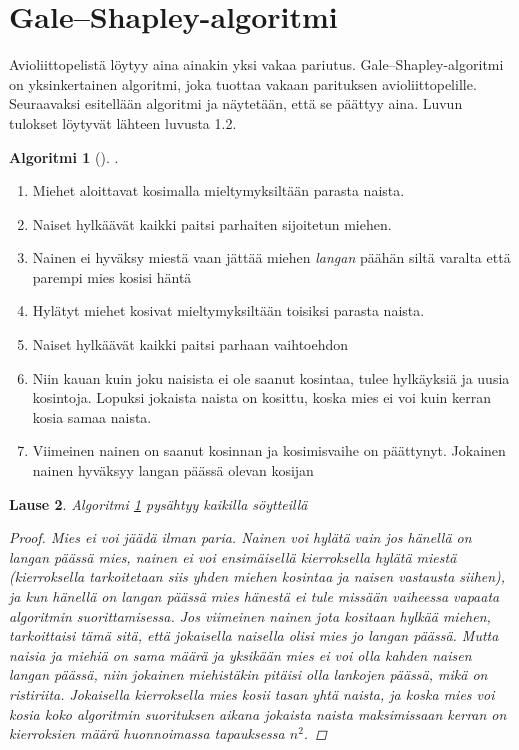 \documentclass[finnish]{tktltiki2}
\newtheorem{lau}{Lause}
\theoremstyle{definition}
\newtheorem{alg}[lau]{Algoritmi}
\theoremstyle{remark}
\begin{document}
\section{Gale--Shapley-algoritmi}
Avioliittopelistä löytyy aina ainakin yksi vakaa pariutus. Gale--Shapley-algoritmi on yksinkertainen algoritmi, joka tuottaa vakaan parituksen avioliittopelille. Seuraavaksi esitellään algoritmi ja näytetään, että se päättyy aina. Luvun tulokset löytyvät lähteen \cite{gusfield1989stable} luvusta 1.2.
\begin{alg} [\cite{gale62a}] \label{gsalg}.
\begin{enumerate}
	\item Miehet aloittavat kosimalla mieltymyksiltään parasta naista.
	\item Naiset hylkäävät kaikki paitsi parhaiten sijoitetun miehen.
	\item Nainen ei hyväksy miestä vaan jättää miehen \emph{langan} päähän siltä varalta että parempi mies kosisi häntä
	\item Hylätyt miehet kosivat mieltymyksiltään toisiksi parasta naista.
	\item Naiset hylkäävät kaikki paitsi parhaan vaihtoehdon
	\item Niin kauan kuin joku naisista ei ole saanut kosintaa, tulee hylkäyksiä ja uusia kosintoja. Lopuksi jokaista naista on kosittu, koska mies ei voi kuin kerran kosia samaa naista.
	\item Viimeinen nainen on saanut kosinnan ja kosimisvaihe on päättynyt. Jokainen nainen hyväksyy langan päässä olevan kosijan
\end{enumerate}
\end{alg}


\begin{lau}
Algoritmi \ref{gsalg} pysähtyy kaikilla söytteillä
\begin{proof}
Mies ei voi jäädä ilman paria. Nainen voi hylätä vain jos hänellä on langan päässä mies, nainen ei voi ensimäisellä kierroksella hylätä miestä (kierroksella tarkoitetaan siis yhden miehen kosintaa ja naisen vastausta siihen), ja kun hänellä on langan päässä mies hänestä ei tule missään vaiheessa vapaata algoritmin suorittamisessa.
Jos viimeinen nainen jota kositaan hylkää miehen, tarkoittaisi tämä sitä, että jokaisella naisella olisi mies jo langan päässä. Mutta naisia ja miehiä on sama määrä ja yksikään mies ei voi olla kahden naisen langan päässä, niin jokainen miehistäkin pitäisi olla lankojen päässä, mikä on ristiriita.
Jokaisella kierroksella mies kosii tasan yhtä naista, ja koska mies voi kosia koko algoritmin suorituksen aikana jokaista naista maksimissaan kerran on kierroksien määrä huonnoimassa tapauksessa $n^2$.
\end{proof}
\end{lau}
\end{document}
